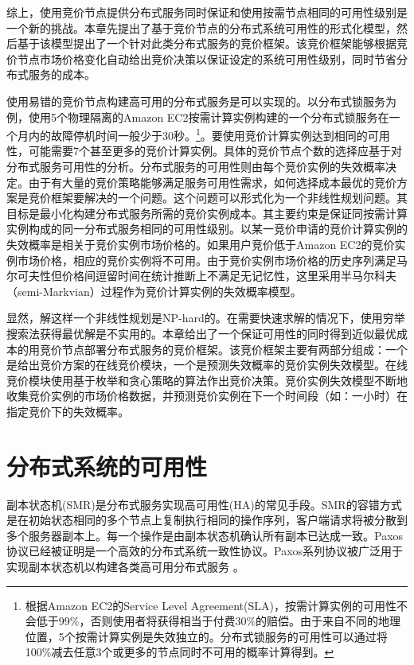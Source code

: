 综上，使用竞价节点提供分布式服务同时保证和使用按需节点相同的可用性级别是一个新的挑战。本章先提出了基于竞价节点的分布式系统可用性的形式化模型，然后基于该模型提出了一个针对此类分布式服务的竞价框架。该竞价框架能够根据竞价节点市场价格变化自动给出竞价决策以保证设定的系统可用性级别，同时节省分布式服务的成本。

使用易错的竞价节点构建高可用的分布式服务是可以实现的。以分布式锁服务为例，使用5个物理隔离的Amazon EC2按需计算实例构建的一个分布式锁服务在一个月内的故障停机时间一般少于30秒。\footnote{根据Amazon EC2的Service Level Agreement(SLA)，按需计算实例的可用性不会低于99\%，否则使用者将获得相当于付费30\%的赔偿。由于来自不同的地理位置，5个按需计算实例是失效独立的。分布式锁服务的可用性可以通过将100\%减去任意3个或更多的节点同时不可用的概率计算得到。}。要使用竞价计算实例达到相同的可用性，可能需要7个甚至更多的竞价计算实例。具体的竞价节点个数的选择应基于对分布式服务可用性的分析。分布式服务的可用性则由每个竞价实例的失效概率决定。由于有大量的竞价策略能够满足服务可用性需求，如何选择成本最优的竞价方案是竞价框架要解决的一个问题。这个问题可以形式化为一个非线性规划问题。其目标是最小化构建分布式服务所需的竞价实例成本。其主要约束是保证同按需计算实例构成的同一分布式服务相同的可用性级别。以某一竞价申请的竞价计算实例的失效概率是相关于竞价实例市场价格的。如果用户竞价低于Amazon EC2的竞价实例市场价格，相应的竞价实例将不可用。由于竞价实例市场价格的历史序列满足马尔可夫性但价格间逗留时间在统计推断上不满足无记忆性，这里采用半马尔科夫（semi-Markvian）过程作为竞价计算实例的失效概率模型。

显然，解这样一个非线性规划是NP-hard的。在需要快速求解的情况下，使用穷举搜索法获得最优解是不实用的。本章给出了一个保证可用性的同时得到近似最优成本的用竞价节点部署分布式服务的竞价框架。该竞价框架主要有两部分组成：一个是给出竞价方案的在线竞价模块，一个是预测失效概率的竞价实例失效模型。在线竞价模块使用基于枚举和贪心策略的算法作出竞价决策。竞价实例失效模型不断地收集竞价实例的市场价格数据，并预测竞价实例在下一个时间段（如：一小时）在指定竞价下的失效概率。

\section{分布式系统的可用性}
\label{sec:jupiter_dist_basis}
副本状态机(SMR)是分布式服务实现高可用性(HA)的常见手段。SMR的容错方式是在初始状态相同的多个节点上复制执行相同的操作序列，客户端请求将被分散到多个服务器副本上。每一个操作是由副本状态机确认所有副本已达成一致。Paxos \cite{lamport2001paxos}协议已经被证明是一个高效的分布式系统一致性协议。Paxos系列协议被广泛用于实现副本状态机以构建各类高可用分布式服务 \cite{Bolosky:2011:PRS:1972457.1972472, Burrows:2006:CLS:1298455.1298487, Mu:2014:PME:2600212.2600218}。

